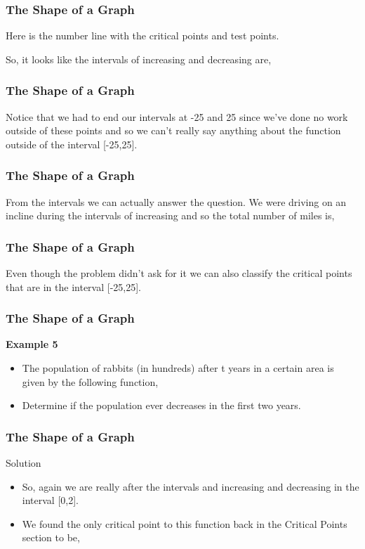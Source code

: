 \documentclass{beamer}
\begin{document}
\begin{frame} 
	\frametitle{The Shape of a Graph}
Here is the number line with the critical points and test points.


So, it looks like the intervals of increasing and decreasing are,

\end{frame}
\begin{frame} 
	\frametitle{The Shape of a Graph}

Notice that we had to end our intervals at -25 and 25 since we’ve done no work outside of these points and so we can’t really say anything about the function outside of the interval [-25,25]. 

\end{frame}
\begin{frame} 
	\frametitle{The Shape of a Graph}
	
From the intervals we can actually answer the question.  We were driving on an incline during the intervals of increasing and so the total number of miles is,

\end{frame}
\begin{frame} 
	\frametitle{The Shape of a Graph}
	
Even though the problem didn’t ask for it we can also classify the critical points that are in the interval [-25,25].

\end{frame}
\begin{frame} 
	\frametitle{The Shape of a Graph}
\textbf{Example 5}
\begin{itemize} 
\item The population of rabbits (in hundreds) after t years in a certain area is given by the following function,

\item Determine if the population ever decreases in the first two years.
\end{itemize}
\end{frame}
\begin{frame} 
	\frametitle{The Shape of a Graph}
	
Solution
\begin{itemize}
\item So, again we are really after the intervals and increasing and decreasing in the interval [0,2].

\item We found the only critical point to this function back in the Critical Points section to be,

\end{itemize}

\end{frame}
\end{document}
